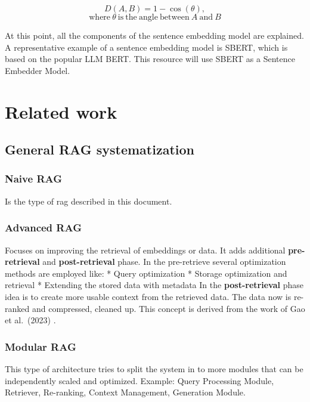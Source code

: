\documentclass{wseas}
\begin{document}

\[
D(A, B) = 1 - \cos(\theta), 
\]
\[
\mathrm{where} \ \theta \ \mathrm{is \ the \ angle \ between} \ A \ \mathrm{and} \ B
\]

At this point, all the components of the sentence embedding model are
explained. A representative example of a sentence embedding model is
SBERT, which is based on the popular LLM BERT. This resource will use
SBERT as a Sentence Embedder Model.


\section{Related work}

\subsection{General RAG
systematization}

\subsubsection{Naive RAG}

Is the type of rag described in this document.

\subsubsection{Advanced RAG}

Focuses on improving the retrieval of embeddings or data. It adds
additional \textbf{pre-retrieval} and \textbf{post-retrieval} phase. In
the pre-retrieve several optimization methods are employed like: * Query
optimization * Storage optimization and retrieval * Extending the stored
data with metadata In the \textbf{post-retrieval} phase idea is to
create more usable context from the retrieved data. The data now is
re-ranked and compressed, cleaned up. This concept is derived from the
work of Gao et al.~(2023) \cite{cite4}.

\subsubsection{Modular RAG}\label{modular-rag}

This type of architecture tries to split the system in to more modules
that can be independently scaled and optimized. Example: Query
Processing Module, Retriever, Re-ranking, Context Management, Generation
Module.
\end{document}
